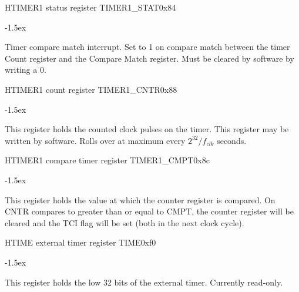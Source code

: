 \documentclass[12pt]{article}
\begin{document}
\begin{register}{H}{TIMER1 status register TIMER1\_STAT}{0x84}
\label{timer1stat}
%
%
%
\regnewline%
\end{register}
\begin{regdesc}[0.8\textwidth]\begin{reglist}[0000]
\itemsep-1.5ex
\item[TCI] Timer compare match interrupt. Set to 1 on compare match between the timer Count register and the Compare Match register. Must be cleared by software by writing a 0.
\end{reglist}\end{regdesc}

\begin{register}{H}{TIMER1 count register TIMER1\_CNTR}{0x88}
\label{timer1cntr}
%
\regnewline%
\end{register}
\begin{regdesc}[0.8\textwidth]\begin{reglist}[0000]
\itemsep-1.5ex
\item[CNTR] This register holds the counted clock pulses on the timer. This register may be written by software. Rolls over at maximum every $2^{32}/f_{clk}$ seconds.
\end{reglist}\end{regdesc}

\begin{register}{H}{TIMER1 compare timer register TIMER1\_CMPT}{0x8c}
\label{timer1cmpt}
%
\regnewline%
\end{register}
\begin{regdesc}[0.8\textwidth]\begin{reglist}[0000]
\itemsep-1.5ex
\item[CMPT] This register holds the value at which the counter register is compared. On CNTR compares to greater than or equal to CMPT, the counter register will be cleared and the TCI flag will be set (both in the next clock cycle).
\end{reglist}\end{regdesc}

\begin{register}{H}{TIME external timer register TIME}{0xf0}
\label{time}
%
\regnewline%
\end{register}
\begin{regdesc}[0.8\textwidth]\begin{reglist}[0000]
\itemsep-1.5ex
\item This register holds the low 32 bits of the external timer. Currently read-only.
\end{reglist}\end{regdesc}
\end{document}
